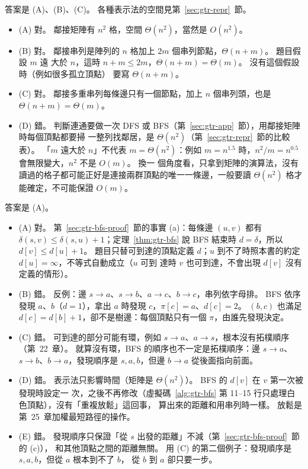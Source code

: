 答案是 (A)、(B)、(C)。 各種表示法的空間見第~\ref{sec:gtr-repr}~節。
\begin{itemize}
\item (A) 對。 鄰接矩陣有 $n^2$ 格，空間 $\Theta(n^2)$，當然是 $O(n^2)$。
\item (B) 對。 鄰接串列是陣列的 $n$ 格加上 $2m$ 個串列節點，$\Theta(n + m)$。 題目假設 $m$ 遠
大於 $n$，這時 $n + m \le 2m$，$\Theta(n + m) = \Theta(m)$。 沒有這個假設時（例如很多孤立頂點）
要寫 $\Theta(n + m)$。
\item (C) 對。 鄰接多重串列每條邊只有一個節點，加上 $n$ 個串列頭，也是 $\Theta(n + m) = \Theta(m)$。
\item (D) 錯。 判斷連通要做一次 DFS 或 BFS（第~\ref{sec:gtr-app}~節），用鄰接矩陣時每個頂點都要掃
一整列找鄰居，是 $\Theta(n^2)$（第~\ref{sec:gtr-repr}~節的比較表）。 「$m$ 遠大於 $n$」不代表
$m = \Theta(n^2)$：例如 $m = n^{1.5}$ 時，$n^2 / m = n^{0.5}$ 會無限變大，$n^2$ 不是 $O(m)$。 換一
個角度看，只拿到矩陣的演算法，沒有讀過的格子都可能正好是連接兩群頂點的唯一一條邊，一般要讀
$\Theta(n^2)$ 格才能確定，不可能保證 $O(m)$。
\end{itemize}

答案是 (A)。
\begin{itemize}
\item (A) 對。 第~\ref{sec:gtr-bfs-proof}~節的事實 (a)：每條邊 $(u, v)$ 都有 $\delta(s, v) \le
\delta(s, u) + 1$；定理~\ref{thm:gtr-bfs} 說 BFS 結束時 $d = \delta$，所以 $d[v] \le d[u] + 1$。
題目只替可到達的頂點定義 $d$；$u$ 到不了時照本書的約定 $d[u] = \infty$，不等式自動成立（$u$ 可到
達時 $v$ 也可到達，不會出現 $d[v]$ 沒有定義的情形）。
\item (B) 錯。 反例：邊 $s \to a$、$s \to b$、$a \to c$、$b \to c$，串列依字母排。 BFS 依序發現
$a$、$b$（$d = 1$），拿出 $a$ 時發現 $c$，$\pi[c] = a$、$d[c] = 2$。 $(b, c)$ 也滿足 $d[c] =
d[b] + 1$，卻不是樹邊：每個頂點只有一個 $\pi$，由誰先發現決定。
\item (C) 錯。 可到達的部分可能有環，例如 $s \to a$、$a \to s$，根本沒有拓樸順序（第~22~章）。
就算沒有環，BFS 的順序也不一定是拓樸順序：邊 $s \to a$、$s \to b$、$b \to a$，發現順序是
$s, a, b$，但邊 $b \to a$ 從後面指向前面。
\item (D) 錯。 表示法只影響時間（矩陣是 $\Theta(n^2)$）。 BFS 的 $d[v]$ 在 $v$ 第一次被發現時設定一
次，之後不再修改（虛擬碼~\ref{alg:gtr-bfs} 第 11--15 行只處理白色頂點），沒有「重複放鬆」這回事，
算出來的距離和用串列時一樣。 放鬆是第~25~章加權最短路徑的操作。
\item (E) 錯。 發現順序只保證「從 $s$ 出發的距離」不減（第~\ref{sec:gtr-bfs-proof}~節的 (c)），
和其他頂點之間的距離無關。 用 (C) 的第二個例子：發現順序是 $s, a, b$，但從 $a$ 根本到不了 $b$，
從 $b$ 到 $a$ 卻只要一步。
\end{itemize}

